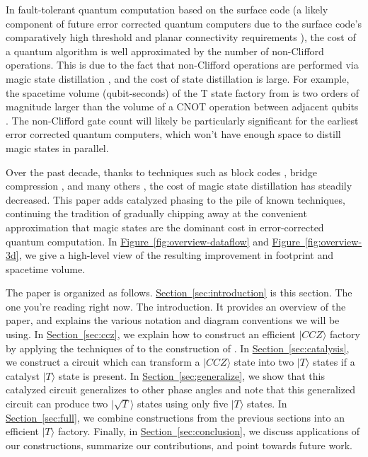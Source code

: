 \documentclass[superscriptaddress,notitlepage,longbibliography]{revtex4-1}
\renewcommand{\sec}[1]{\hyperref[sec:#1]{Section~\ref*{sec:#1}}}
\newcommand{\fig}[1]{\hyperref[fig:#1]{Figure~\ref*{fig:#1}}}
\begin{document}
In fault-tolerant quantum computation based on the surface code (a likely component of future error corrected quantum computers due to the surface code's comparatively high threshold and planar connectivity requirements \cite{Brav98,Denn02,Raus07,Raus07d,Fowl12f}), the cost of a quantum algorithm is well approximated by the number of non-Clifford operations.
This is due to the fact that non-Clifford operations are performed via magic state distillation \cite{bravyi2005}, and the cost of state distillation is large.
For example, the spacetime volume (qubit-seconds) of the T state factory from \cite{fowler2018} is two orders of magnitude larger than the volume of a CNOT operation between adjacent qubits \cite{horsman2012}.
The non-Clifford gate count will likely be particularly significant for the earliest error corrected quantum computers, which won't have enough space to distill magic states in parallel.

Over the past decade, thanks to techniques such as block codes \cite{bravyi2012, fowler2013}, bridge compression \cite{fowler2012}, and many others \cite{horsman2012, campbell2017, campbell2018, litinski2018}, the cost of magic state distillation has steadily decreased.
This paper adds catalyzed phasing to the pile of known techniques, continuing the tradition of gradually chipping away at the convenient approximation that magic states are the dominant cost in error-corrected quantum computation.
In \fig{overview-dataflow} and \fig{overview-3d}, we give a high-level view of the resulting improvement in footprint and spacetime volume.

The paper is organized as follows.
\sec{introduction} is this section. The one you're reading right now. The introduction.
It provides an overview of the paper, and explains the various notation and diagram conventions we will be using.
In \sec{ccz}, we explain how to construct an efficient $|CCZ\rangle$ factory by applying the techniques of \cite{fowler2018} to the construction of \cite{jones2013, eastin2013distilling}.
In \sec{catalysis}, we construct a circuit which can transform a $|CCZ\rangle$ state into two $|T\rangle$ states if a catalyst $|T\rangle$ state is present.
In \sec{generalize}, we show that this catalyzed circuit generalizes to other phase angles and note that this generalized circuit can produce two $|\sqrt{T}\rangle$ states using only five $|T\rangle$ states.
In \sec{full}, we combine constructions from the previous sections into an efficient $|T\rangle$ factory.
Finally, in \sec{conclusion}, we discuss applications of our constructions, summarize our contributions, and point towards future work.
\end{document}
